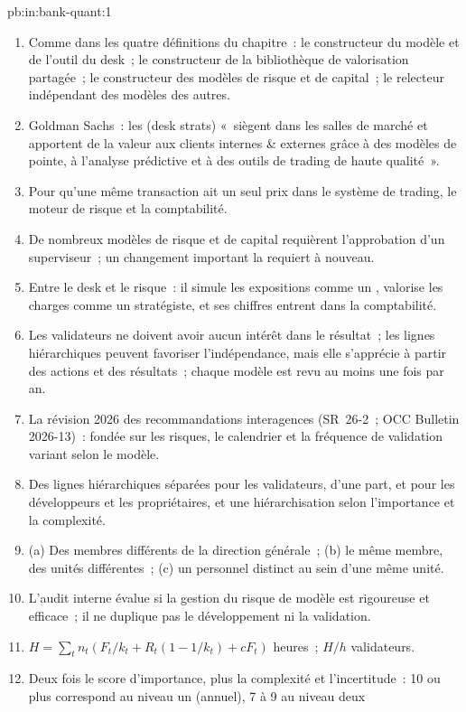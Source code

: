 \begin{solution}{pb:in:bank-quant:1}
\begin{enumerate}
\item Comme dans les quatre définitions du chapitre~: le constructeur du modèle et de l'outil du desk~; le constructeur de la bibliothèque de valorisation partagée~;
le constructeur des modèles de risque et de capital~; le relecteur indépendant des modèles des autres.
\item Goldman Sachs~: les  (desk strats) «~siègent dans les salles de marché et apportent de la valeur aux clients internes \& externes grâce
à des modèles de pointe, à l'analyse prédictive et à des outils de trading de haute qualité~».
\item Pour qu'une même transaction ait un seul prix dans le système de trading, le moteur de risque et la comptabilité.
\item De nombreux modèles de risque et de capital requièrent l'approbation d'un superviseur~; un changement important la requiert à nouveau.
\item Entre le desk et le risque~: il simule les expositions comme un , valorise les charges comme un stratégiste, et ses
chiffres entrent dans la comptabilité.
\item Les validateurs ne doivent avoir aucun intérêt dans le résultat~; les lignes hiérarchiques peuvent favoriser l'indépendance, mais elle s'apprécie
à partir des actions et des résultats~; chaque modèle est revu au moins une fois par an.
\item La révision 2026 des recommandations interagences (SR~26-2~; OCC Bulletin 2026-13)~: fondée sur les risques, le calendrier et la fréquence de
validation variant selon le modèle.
\item Des lignes hiérarchiques séparées pour les validateurs, d'une part, et pour les développeurs et les propriétaires, et une hiérarchisation selon l'importance et la complexité.
\item (a) Des membres différents de la direction générale~; (b) le même membre, des unités différentes~; (c) un personnel distinct au sein d'une même unité.
\item L'audit interne évalue si la gestion du risque de modèle est rigoureuse et efficace~; il ne duplique pas le développement
ni la validation.
\item $H=\sum_t n_t(F_t/k_t+R_t(1-1/k_t)+cF_t)$ heures~; $H/h$ validateurs.
\item Deux fois le score d'importance, plus la complexité et l'incertitude~: 10 ou plus correspond au niveau un (annuel), 7 à 9 au niveau deux

\end{enumerate}
\end{solution}
